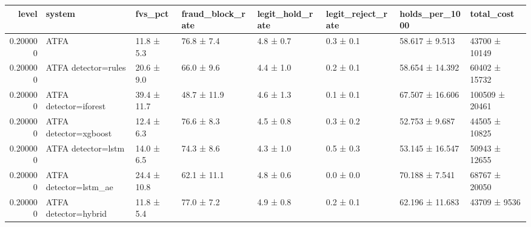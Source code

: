 \begin{tabular}{rlllllll}
\toprule
level & system & fvs\_pct & fraud\_block\_rate & legit\_hold\_rate & legit\_reject\_rate & holds\_per\_1000 & total\_cost \\
\midrule
0.200000 & ATFA & 11.8 ± 5.3 & 76.8 ± 7.4 & 4.8 ± 0.7 & 0.3 ± 0.1 & 58.617 ± 9.513 & 43700 ± 10149 \\
0.200000 & ATFA detector=rules & 20.6 ± 9.0 & 66.0 ± 9.6 & 4.4 ± 1.0 & 0.2 ± 0.1 & 58.654 ± 14.392 & 60402 ± 15732 \\
0.200000 & ATFA detector=iforest & 39.4 ± 11.7 & 48.7 ± 11.9 & 4.6 ± 1.3 & 0.1 ± 0.1 & 67.507 ± 16.606 & 100509 ± 20461 \\
0.200000 & ATFA detector=xgboost & 12.4 ± 6.3 & 76.6 ± 8.3 & 4.5 ± 0.8 & 0.3 ± 0.2 & 52.753 ± 9.687 & 44505 ± 10825 \\
0.200000 & ATFA detector=lstm & 14.0 ± 6.5 & 74.3 ± 8.6 & 4.3 ± 1.0 & 0.5 ± 0.3 & 53.145 ± 16.547 & 50943 ± 12655 \\
0.200000 & ATFA detector=lstm\_ae & 24.4 ± 10.8 & 62.1 ± 11.1 & 4.8 ± 0.6 & 0.0 ± 0.0 & 70.188 ± 7.541 & 68767 ± 20050 \\
0.200000 & ATFA detector=hybrid & 11.8 ± 5.4 & 77.0 ± 7.2 & 4.9 ± 0.8 & 0.2 ± 0.1 & 62.196 ± 11.683 & 43709 ± 9536 \\
\bottomrule
\end{tabular}
